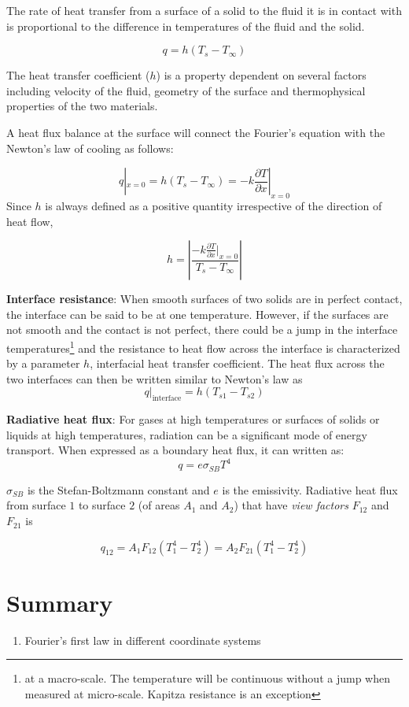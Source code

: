 The rate of heat transfer from a surface of a solid to the fluid it is in contact with is proportional to the difference in temperatures of the fluid and the solid.

$$q=h \left( T_s - T_\infty\right)$$

The heat transfer coefficient ($h$) is a property dependent on several factors including velocity of the fluid, geometry of the surface and thermophysical properties of the two materials.

A heat flux balance at the surface will connect the Fourier's equation with the  Newton's law of cooling as follows:

$$ q|_{x=0} = h\left( T_s - T_\infty \right) = -k \frac{\partial T}{\partial x} |_{x=0} $$
Since $h$ is always defined as a positive quantity irrespective of the direction of heat flow,

$$ h = \left| \frac{-k\frac{\partial T}{\partial x}|_{x=0}}{T_s - T_\infty} \right| $$

\textbf{Interface resistance}: When smooth surfaces of two solids are in perfect contact, the interface can be said to be at one temperature. However, if the surfaces are not smooth and the contact is not perfect, there could be a jump in the interface temperatures\footnote{at a macro-scale. The temperature will be continuous without a jump when measured at micro-scale. Kapitza resistance is an exception} and the resistance to heat flow across the interface is characterized by a parameter $h$, interfacial heat transfer coefficient. The heat flux across the two interfaces can then be written similar to Newton's law as 
$$ q|_\text{interface} = h \left(T_{s1} - T_{s2} \right) $$

\textbf{Radiative heat flux}: For gases at high temperatures or surfaces of solids or liquids at high temperatures, radiation can be a significant mode of energy transport. When expressed as a boundary heat flux, it can written as:
$$ q = e \sigma_{SB}T^4 $$

$\sigma_{SB}$ is the Stefan-Boltzmann constant and $e$ is the emissivity. Radiative heat flux from surface $1$ to surface $2$ (of areas $A_1$ and $A_2$) that have \textit{view factors} $F_{12}$ and $F_{21}$ is

$$q_{12} = A_1 F_{12} (T_1^4 - T_2^4) = A_2 F_{21} (T_1^4 - T_2^4) $$


\section{Summary}

\begin{enumerate}
\item Fourier's first law in different coordinate systems
\end{enumerate}

